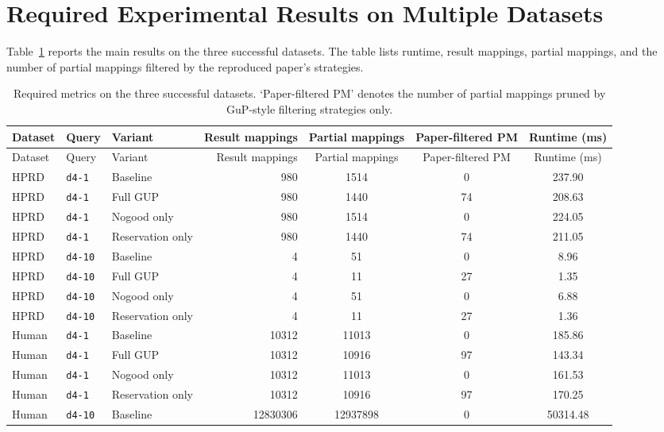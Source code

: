 \section{Required Experimental Results on Multiple Datasets}
\label{sec:exp-results}

Table~\ref{tab:required-metrics} reports the main results on the three successful datasets. The table lists runtime, result mappings, partial mappings, and the number of partial mappings filtered by the reproduced paper's strategies.

\begin{longtable}{lllrccc}
  \caption{Required metrics on the three successful datasets. `Paper-filtered PM' denotes the number of partial mappings pruned by GuP-style filtering strategies only.}\label{tab:required-metrics}\\
  \toprule
  Dataset & Query & Variant & Result mappings & Partial mappings & Paper-filtered PM & Runtime (ms) \\
  \midrule
  \endfirsthead
  \toprule
  Dataset & Query & Variant & Result mappings & Partial mappings & Paper-filtered PM & Runtime (ms) \\
  \midrule
  \endhead
  HPRD & \texttt{d4-1} & Baseline & 980 & 1514 & 0 & 237.90 \\
  HPRD & \texttt{d4-1} & Full GUP & 980 & 1440 & 74 & 208.63 \\
  HPRD & \texttt{d4-1} & Nogood only & 980 & 1514 & 0 & 224.05 \\
  HPRD & \texttt{d4-1} & Reservation only & 980 & 1440 & 74 & 211.05 \\
  \midrule
  HPRD & \texttt{d4-10} & Baseline & 4 & 51 & 0 & 8.96 \\
  HPRD & \texttt{d4-10} & Full GUP & 4 & 11 & 27 & 1.35 \\
  HPRD & \texttt{d4-10} & Nogood only & 4 & 51 & 0 & 6.88 \\
  HPRD & \texttt{d4-10} & Reservation only & 4 & 11 & 27 & 1.36 \\
  \midrule
  Human & \texttt{d4-1} & Baseline & 10312 & 11013 & 0 & 185.86 \\
  Human & \texttt{d4-1} & Full GUP & 10312 & 10916 & 97 & 143.34 \\
  Human & \texttt{d4-1} & Nogood only & 10312 & 11013 & 0 & 161.53 \\
  Human & \texttt{d4-1} & Reservation only & 10312 & 10916 & 97 & 170.25 \\
  \midrule
  Human & \texttt{d4-10} & Baseline & 12830306 & 12937898 & 0 & 50314.48 \\

\end{longtable}
